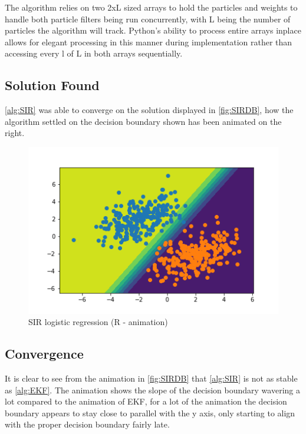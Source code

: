 \documentclass[sigconf]{acmart}
\begin{document}
The algorithm relies on two 2xL sized arrays to hold the particles and weights to handle both particle filters being run concurrently, with L being the number of particles the algorithm will track. Python's ability to process entire arrays inplace allows for elegant processing in this manner during implementation rather than accessing every l of L in both arrays sequentially.
\subsection{Solution Found}
\autoref{alg:SIR} was able to converge on the solution displayed in \autoref{fig:SIRDB}, how the algorithm settled on the decision boundary shown has been animated on the right.

\begin{figure}[!h]
  \begin{minipage}[b]{0.4\textwidth}
    \includegraphics[scale=0.5]{../Part 3/DecisionBoundary.png}
  \end{minipage}
  \hfill
  \begin{minipage}[b]{0.4\textwidth}
  \end{minipage}
  \caption{SIR logistic regression (R - animation)}
  \label{fig:SIRDB}
\end{figure}

\subsection{Convergence}
It is clear to see from the animation in \autoref{fig:SIRDB} that \autoref{alg:SIR} is not as stable as \autoref{alg:EKF}. The animation shows the slope of the decision boundary wavering a lot compared to the animation of EKF, for a lot of the animation the decision boundary appears to stay close to parallel with the y axis, only starting to align with the proper decision boundary fairly late.
\end{document}
